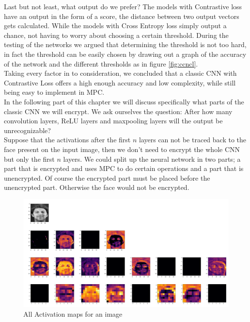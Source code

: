 Last but not least, what output do we prefer? The models with Contrastive loss have an output in the form of a score, the distance between two output vectors gets calculated. While the models with Cross Entropy loss simply output a chance, not having to worry about choosing a certain threshold. During the testing of the networks we argued that determining the threshold is not too hard, in fact the threshold can be easily chosen by drawing out a graph of the accuracy of the network and the different thresholds as in figure \ref{fig:ccncl}.\\

Taking every factor in to consideration, we concluded that a classic CNN with Contrastive Loss offers a high enough accuracy and low complexity, while still being easy to implement in MPC.\\

In the following part of this chapter we will discuss specifically what parts of the classic CNN we will encrypt. We ask ourselves the question: After how many convolution layers, ReLU layers and maxpooling layers will the output be unrecognizable?\\

 Suppose that the activations after the first $n$ layers can not be traced back to the face present on the input image, then we don't need to encrypt the whole CNN but only the first $n$ layers. We could split up the neural network in two parts; a part that is encrypted and uses MPC to do certain operations and a part that is unencrypted. Of course the encrypted part must be placed before the unencrypted part. Otherwise the face would not be encrypted.

\begin{figure}[H]
  \includegraphics[scale=0.2]{fig/activations/7.png}
  \centering
  \caption{All Activation maps for an image}
  \label{fig:activations}
\end{figure}

